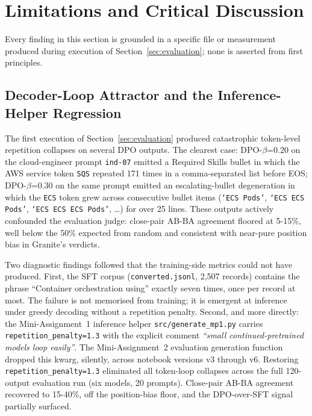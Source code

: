 \documentclass[../main.tex]{subfiles}
\begin{document}
\section{Limitations and Critical Discussion}
\label{sec:limitations}

Every finding in this section is grounded in a specific file or measurement produced during execution of Section~\ref{sec:evaluation}; none is asserted from first principles.

\subsection{Decoder-Loop Attractor and the Inference-Helper Regression}
\label{sec:decoder_loop}

The first execution of Section~\ref{sec:evaluation} produced catastrophic token-level repetition collapses on several DPO outputs. The clearest case: DPO-$\beta$=0.20 on the cloud-engineer prompt \texttt{ind-07} emitted a Required Skills bullet in which the AWS service token \texttt{SQS} repeated 171 times in a comma-separated list before EOS; DPO-$\beta$=0.30 on the same prompt emitted an escalating-bullet degeneration in which the \texttt{ECS} token grew across consecutive bullet items (\texttt{`ECS Pods'}, \texttt{`ECS ECS Pods'}, \texttt{`ECS ECS ECS Pods'}, \ldots) for over 25 lines. These outputs actively confounded the evaluation judge: close-pair AB-BA agreement floored at 5-15\%, well below the 50\% expected from random and consistent with near-pure position bias in Granite's verdicts.

Two diagnostic findings followed that the training-side metrics could not have produced. First, the SFT corpus (\texttt{converted.jsonl}, 2{,}507 records) contains the phrase ``Container orchestration using'' exactly seven times, once per record at most. The failure is not memorised from training; it is emergent at inference under greedy decoding without a repetition penalty. Second, and more directly: the Mini-Assignment~1 inference helper \texttt{src/generate\_mp1.py} carries \texttt{repetition\_penalty=1.3} with the explicit comment \emph{``small continued-pretrained models loop easily''}. The Mini-Assignment~2 evaluation generation function dropped this kwarg, silently, across notebook versions v3 through v6. Restoring \texttt{repetition\_penalty=1.3} eliminated all token-loop collapses across the full 120-output evaluation run (six models, 20 prompts). Close-pair AB-BA agreement recovered to 15-40\%, off the position-bias floor, and the DPO-over-SFT signal partially surfaced.
\end{document}

